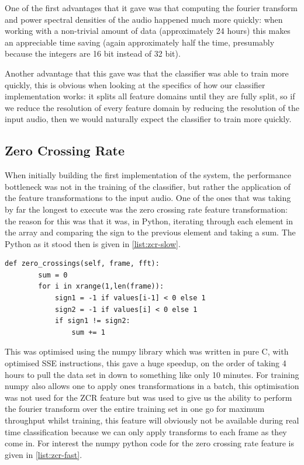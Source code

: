\documentclass[ %
                    author={Sam Phippen},
                supervisor={Dr. Rafal Bogacz},
                     title={Real time voice activity detectors in noisy personal computing environments},
                  subtitle={},
                    degree={MEng},
                      year={2012} ]{thesis}
\begin{document}
One of the first advantages that it gave was that computing the fourier
transform and power spectral densities of the audio happened much more quickly:
when working with a non-trivial amount of data (approximately 24 hours) this
makes an appreciable time saving (again approximately half the time, presumably
because the integers are 16 bit instead of 32 bit).

Another advantage that this gave was that the classifier was able to train more
quickly, this is obvious when looking at the specifics of how our classifier
implementation works: it splits all feature domains until they are fully split,
so if we reduce the resolution of every feature domain by reducing the
resolution of the input audio, then we would naturally expect the classifier to
train more quickly.

\subsection{Zero Crossing Rate}

When initially building the first implementation of the system, the performance
bottleneck was not in the training of the classifier, but rather the
application of the feature transformations to the input audio. One of the ones
that was taking by far the longest to execute was the zero crossing rate
feature transformation: the reason for this was that it was, in Python,
iterating through each element in the array and comparing the sign to the
previous element and taking a sum. The Python as it stood then is given in
\ref{list:zcr-slow}.


\begin{lstlisting}[frame=single,caption=Original slow zero crossing rate implementation, label=list:zcr-slow]  % Start your code-block
    def zero_crossings(self, frame, fft):
        sum = 0
        for i in xrange(1,len(frame)):
            sign1 = -1 if values[i-1] < 0 else 1
            sign2 = -1 if values[i] < 0 else 1
            if sign1 != sign2:
                sum += 1
\end{lstlisting}

This was optimised using the numpy library which was written in pure C, with
optimised SSE instructions, this gave a huge speedup, on the order of taking 4 hours to
pull the data set in down to something like only 10 minutes. For training numpy also
allows one to apply ones transformations in a batch, this optimisation was not
used for the ZCR feature but was used to give us the ability to perform the
fourier transform over the entire training set in one go for maximum throughput
whilst training, this feature will obviously not be available during real time
classification because we can only apply transforms to each frame as they come
in. For interest the numpy python code for the zero crossing rate feature is
given in \ref{list:zcr-fast}.
\end{document}
